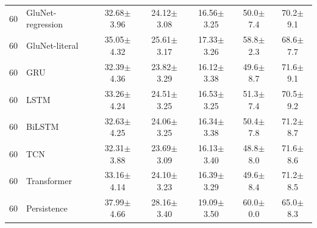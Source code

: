 \documentclass[conference]{IEEEtran}
\begin{document}
\begin{table}[t]
\begin{tabular}{llccccc}
60 & GluNet-regression & 32.68$\pm$3.96 & 24.12$\pm$3.08 & 16.56$\pm$3.25 & 50.0$\pm$7.4 & 70.2$\pm$9.1\\
60 & GluNet-literal & 35.05$\pm$4.32 & 25.61$\pm$3.17 & 17.33$\pm$3.26 & 58.8$\pm$2.3 & 68.6$\pm$7.7\\
60 & GRU & 32.39$\pm$4.36 & 23.82$\pm$3.29 & 16.12$\pm$3.38 & 49.6$\pm$8.7 & 71.6$\pm$9.1\\
60 & LSTM & 33.26$\pm$4.24 & 24.51$\pm$3.25 & 16.53$\pm$3.25 & 51.3$\pm$7.4 & 70.5$\pm$9.2\\
60 & BiLSTM & 32.63$\pm$4.25 & 24.06$\pm$3.25 & 16.34$\pm$3.38 & 50.4$\pm$7.8 & 71.2$\pm$8.7\\
60 & TCN & 32.31$\pm$3.88 & 23.69$\pm$3.09 & 16.13$\pm$3.40 & 48.8$\pm$8.0 & 71.6$\pm$8.6\\
60 & Transformer & 33.16$\pm$4.14 & 24.10$\pm$3.23 & 16.39$\pm$3.29 & 49.6$\pm$8.4 & 71.2$\pm$8.5\\
60 & Persistence & 37.99$\pm$4.66 & 28.16$\pm$3.40 & 19.09$\pm$3.50 & 60.0$\pm$0.0 & 65.0$\pm$8.3\\
\bottomrule
\end{tabular}\end{table}
\end{document}
